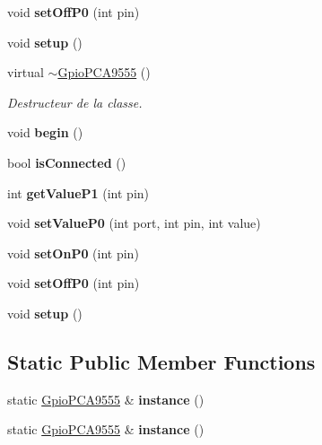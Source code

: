 \begin{DoxyCompactItemize}
void {\bfseries set\+Off\+P0} (int pin)
\item 
\mbox{\label{classGpioPCA9555_a37241d63443930d64a8d42cd4bcb6a37}} 
void {\bfseries setup} ()
\item 
\mbox{\label{classGpioPCA9555_a3f8929052c69810d59ef143e94af23ad}} 
virtual \hyperlink{classGpioPCA9555_a3f8929052c69810d59ef143e94af23ad}{$\sim$\+Gpio\+P\+C\+A9555} ()
\begin{DoxyCompactList}\small\item\em Destructeur de la classe. \end{DoxyCompactList}\item 
\mbox{\label{classGpioPCA9555_a449f0a1c42549950193db56296758e50}} 
void {\bfseries begin} ()
\item 
\mbox{\label{classGpioPCA9555_adca3966252205ecd62523e39fc8e02d2}} 
bool {\bfseries is\+Connected} ()
\item 
\mbox{\label{classGpioPCA9555_a22dbebb8c5fffe0d0c119c6d958276e7}} 
int {\bfseries get\+Value\+P1} (int pin)
\item 
\mbox{\label{classGpioPCA9555_a275bd8ed5c0b8bf2e22ea488ecf06456}} 
void {\bfseries set\+Value\+P0} (int port, int pin, int value)
\item 
\mbox{\label{classGpioPCA9555_a6cde1194bb5855ed2e59c7f29ba5e81e}} 
void {\bfseries set\+On\+P0} (int pin)
\item 
\mbox{\label{classGpioPCA9555_aec22091c7c82bb5d1723cdecaf968a7a}} 
void {\bfseries set\+Off\+P0} (int pin)
\item 
\mbox{\label{classGpioPCA9555_a37241d63443930d64a8d42cd4bcb6a37}} 
void {\bfseries setup} ()
\end{DoxyCompactItemize}
\subsection*{Static Public Member Functions}
\begin{DoxyCompactItemize}
\item 
\mbox{\label{classGpioPCA9555_af9f8fb2ed90d56abc86cfb06d2033441}} 
static \hyperlink{classGpioPCA9555}{Gpio\+P\+C\+A9555} \& {\bfseries instance} ()
\item 
\mbox{\label{classGpioPCA9555_af9f8fb2ed90d56abc86cfb06d2033441}} 
static \hyperlink{classGpioPCA9555}{Gpio\+P\+C\+A9555} \& {\bfseries instance} ()
\end{DoxyCompactItemize}


